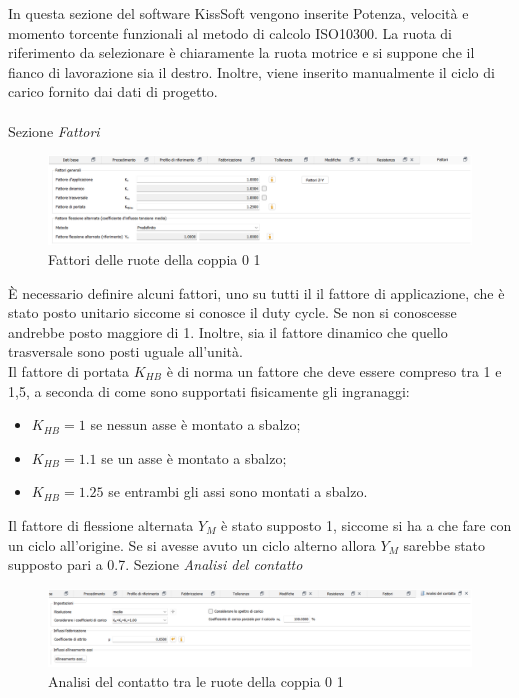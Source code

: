 In questa sezione del software KissSoft vengono inserite Potenza, velocità e momento torcente funzionali al metodo di calcolo ISO10300. La ruota di riferimento da selezionare è chiaramente la ruota motrice e si suppone che il fianco di lavorazione sia il destro. Inoltre, viene inserito manualmente il ciclo di carico fornito dai dati di progetto.\\
\\
Sezione \emph{Fattori}
\begin{figure}[h]
    \centering
    \includegraphics[scale=0.32]{Immagini/FattoriCoppia01.png}
    \caption{Fattori delle ruote della coppia 0 1}
    \label{fig:FattoriCoppia01}
\end{figure}

È necessario definire alcuni fattori, uno su tutti il il fattore di applicazione, che è stato posto unitario siccome si conosce il duty cycle. Se non si conoscesse andrebbe posto maggiore di 1. Inoltre, sia il fattore dinamico che quello trasversale sono posti uguale all’unità.\\
Il fattore di portata $K_{HB}$ è di norma un fattore che deve essere compreso tra 1 e 1,5, a seconda di come sono supportati fisicamente gli ingranaggi: 
\begin{itemize}
    \item $K_{HB}=1$ se nessun asse è montato a sbalzo;
    \item $K_{HB}=1.1$ se un asse è montato a sbalzo;
    \item $K_{HB}=1.25$ se entrambi gli assi sono montati a sbalzo. 
\end{itemize}
Il fattore di flessione alternata $Y_M$ è stato supposto 1, siccome si ha a che fare con un ciclo all’origine. Se si avesse avuto un ciclo alterno allora $Y_M$ sarebbe stato supposto pari a 0.7.
\newpage
Sezione \emph{Analisi del contatto}
\begin{figure}[h]
    \centering
    \includegraphics[scale=0.45]{Immagini/AnalisiContattoCoppia01.png}
    \caption{Analisi del contatto tra le ruote della coppia 0 1}
    \label{fig:AnalisiContattoCoppia01}
\end{figure}

